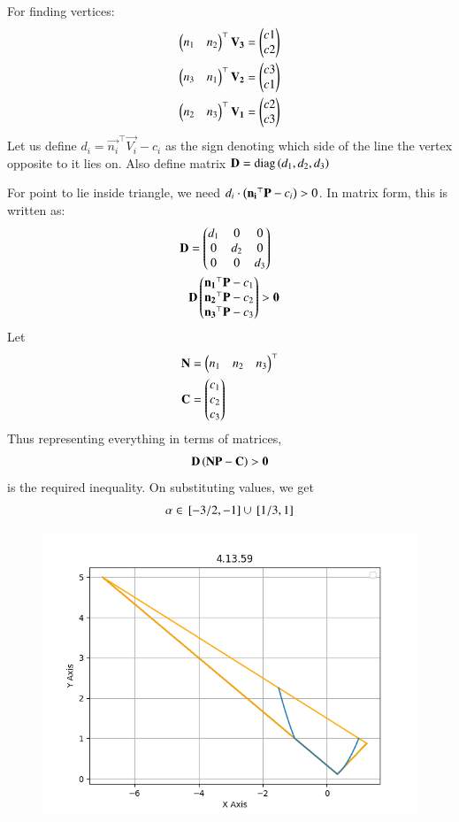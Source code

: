 \documentclass[journal,12pt,onecolumn]{IEEEtran}
\theoremstyle{remark}
\begin{document}
For finding vertices:
\begin{align}
 \begin{pmatrix}n_1 & n_2\end{pmatrix}^\top\mathbf{V_3} = \begin{pmatrix}c1 \\ c2\end{pmatrix} \\
 \begin{pmatrix}n_3 & n_1\end{pmatrix}^\top\mathbf{V_2} = \begin{pmatrix}c3 \\ c1\end{pmatrix} \\
 \begin{pmatrix}n_2 & n_3\end{pmatrix}^\top\mathbf{V_1} = \begin{pmatrix}c2 \\ c3\end{pmatrix}
\end{align}
Let us define $d_i = \vec{n_i}^\top\vec{V_i}-c_i$ as the sign denoting which side of the line the vertex opposite to it lies on. Also define matrix $\mathbf{D} = \text{diag}\left(d_1,d_2,d_3\right)$ \par\noindent
For point to lie inside triangle, we need $d_i\cdot\left(\mathbf{n_i}^\top\mathbf{P}-c_i\right) > 0$. In matrix form, this is written as:
\begin{align}
\mathbf{D} &= \begin{pmatrix}d_1 & 0 & 0 \\ 0 & d_2 & 0 \\ 0 & 0 & d_3\end{pmatrix} \\
  &\mathbf{D}\begin{pmatrix}\mathbf{n_1}^\top\mathbf{P}-c_1 \\ \mathbf{n_2}^\top\mathbf{P}-c_2 \\ \mathbf{n_3}^\top\mathbf{P}-c_3\end{pmatrix} > \mathbf{0}
\end{align}
Let
\begin{align}
 \mathbf{N} &= \begin{pmatrix}n_1 & n_2 & n_3\end{pmatrix}^\top \\
 \mathbf{C} &= \begin{pmatrix}c_1 \\ c_2 \\ c_3\end{pmatrix}
\end{align}
Thus representing everything in terms of matrices,
\begin{align}
 \mathbf{D}\left(\mathbf{N}\mathbf{P}-\mathbf{C}\right) > \mathbf{0}
\end{align}
is the required inequality. On substituting values, we get
\begin{align}
 \alpha \in {}\left[-3/2,-1\right] \cup {}\left[1/3, 1\right]
\end{align}
\begin{figure}[H]
    \centering
    \includegraphics{figs/plot.png}
    \caption*{}
    \label{fig:plot}
\end{figure}
\end{document}
